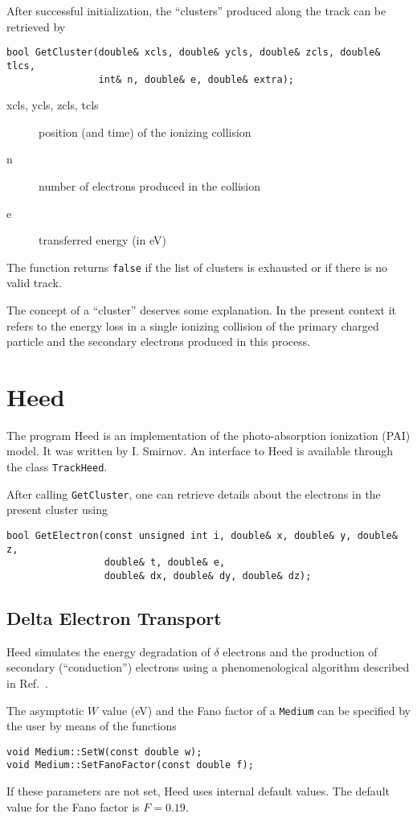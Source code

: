 After successful initialization, the ``clusters'' produced along the track
can be retrieved by
\begin{lstlisting}
bool GetCluster(double& xcls, double& ycls, double& zcls, double& tlcs,
                int& n, double& e, double& extra);
\end{lstlisting}
\begin{description}
  \item[xcls, ycls, zcls, tcls] 
  position (and time) of the ionizing collision
  \item[n] number of electrons produced in the collision
  \item[e] transferred energy (in eV)
\end{description}
The function returns \texttt{false} if the list of clusters is exhausted
 or if there is no valid track.

The concept of a ``cluster'' deserves some explanation. 
In the present context it refers to the energy loss in a single ionizing 
collision of the primary charged particle and the secondary 
electrons produced in this process. 


\section{Heed}

The program Heed \cite{Smirnov2005} is an implementation 
of the photo-absorption ionization (PAI) model. 
It was written by I. Smirnov.
An interface to Heed is available through the class \texttt{TrackHeed}. 

After calling \texttt{GetCluster}, 
one can retrieve details about the 
electrons in the present cluster using
\begin{lstlisting}
bool GetElectron(const unsigned int i, double& x, double& y, double& z,
                 double& t, double& e, 
                 double& dx, double& dy, double& dz);
\end{lstlisting}

\subsection{Delta Electron Transport}

Heed simulates the energy degradation of \(\delta\) electrons and 
the production of secondary (``conduction'') electrons 
using a phenomenological algorithm described in Ref.~\cite{Smirnov2005}.

The asymptotic \(W\) value (eV) and the Fano factor of a 
\texttt{Medium} can be specified by the user by means of the functions
\begin{lstlisting}
void Medium::SetW(const double w);
void Medium::SetFanoFactor(const double f);
\end{lstlisting}
If these parameters are not set, Heed uses internal default values. 
The default value for the Fano factor is \(F = 0.19\).

